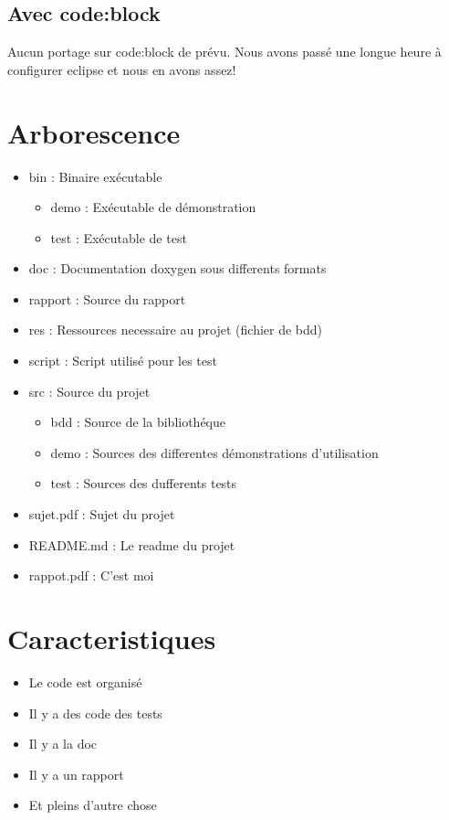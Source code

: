 \documentclass[a4paper]{article}
\begin{document}
\subsection{Avec code:block}

Aucun portage sur code:block de prévu. 
Nous avons passé une longue heure à configurer eclipse et nous en avons assez!

\section{Arborescence}

\begin{itemize}
\item bin : Binaire exécutable
\begin{itemize}
  \item demo : Exécutable de démonstration
  \item test : Exécutable de test
\end{itemize}
\item doc : Documentation doxygen sous differents formats
\item rapport : Source du rapport
\item res : Ressources necessaire au projet (fichier de bdd)
\item script  : Script utilisé pour les test
\item src : Source du projet
\begin{itemize}
  \item bdd   : Source de la bibliothéque
  \item demo  : Sources des differentes démonstrations d'utilisation
  \item test  : Sources des dufferents tests
\end{itemize}

\item sujet.pdf  : Sujet du projet
\item README.md  : Le readme du projet 
\item rappot.pdf : C'est moi
\end{itemize}

\section{Caracteristiques}

\begin{itemize}
	\item Le code est organisé
	\item Il y a des code des tests
	\item Il y a la doc
	\item Il y a un rapport
	\item Et pleins d'autre chose
\end{itemize}
\end{document}
